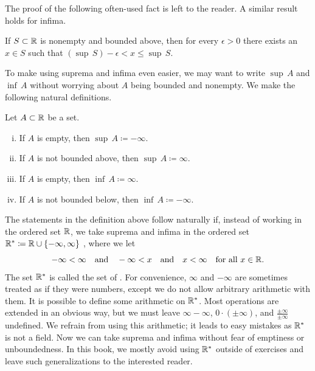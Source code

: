 The proof of the following
often-used fact is left to the reader.
A similar result holds for infima.

\begin{prop} \label{prop:existsxepsfromsup}
If $S \subset {\mathbb{R}}$ is nonempty and bounded above,
then for every $\epsilon > 0$ there exists an $x \in S$ such
that $(\sup\, S) - \epsilon < x \leq \sup\, S$.
\end{prop}


To make using suprema and infima even easier, we may want to
write $\sup\, A$ and $\inf\, A$ without worrying about $A$ being
bounded and nonempty.  We make the following natural definitions.

\begin{defn}
Let $A \subset {\mathbb{R}}$ be a set.
\begin{enumerate}[(i)]
\item If $A$ is empty, then $\sup\, A \coloneqq -\infty$.
\item If $A$ is not bounded above, then $\sup\, A \coloneqq \infty$.
\item If $A$ is empty, then $\inf\, A \coloneqq \infty$.
\item If $A$ is not bounded below, then $\inf\, A \coloneqq -\infty$.
\end{enumerate}
\end{defn}

The statements in the definition above
follow naturally if, instead of working in 
the ordered set ${\mathbb{R}}$, we take suprema and infima
in the ordered set
${\mathbb{R}}^* \coloneqq {\mathbb{R}} \cup \{ -\infty , \infty\}$
,
where we let
\begin{equation*}
-\infty < \infty \quad \text{and} \quad
-\infty < x \quad \text{and} \quad
x < \infty \quad \text{for all $x \in {\mathbb{R}}$}.
\end{equation*}
The set ${\mathbb{R}}^*$ is called the set of \emph{}.
For convenience, $\infty$ and $-\infty$ are sometimes treated as if they were
numbers, except we do not allow arbitrary arithmetic with them.
It is possible to define some arithmetic on ${\mathbb{R}}^*$.  Most operations
are extended in an obvious way, but we must leave
$\infty-\infty$, $0 \cdot (\pm\infty)$, and $\frac{\pm\infty}{\pm\infty}$
undefined.
We refrain from
using this arithmetic;
it leads to easy mistakes as ${\mathbb{R}}^*$ is not a field.
Now we can take suprema and infima without fear of emptiness or
unboundedness.  In this book, we mostly avoid
using ${\mathbb{R}}^*$ outside of exercises and leave such generalizations to the interested reader.

